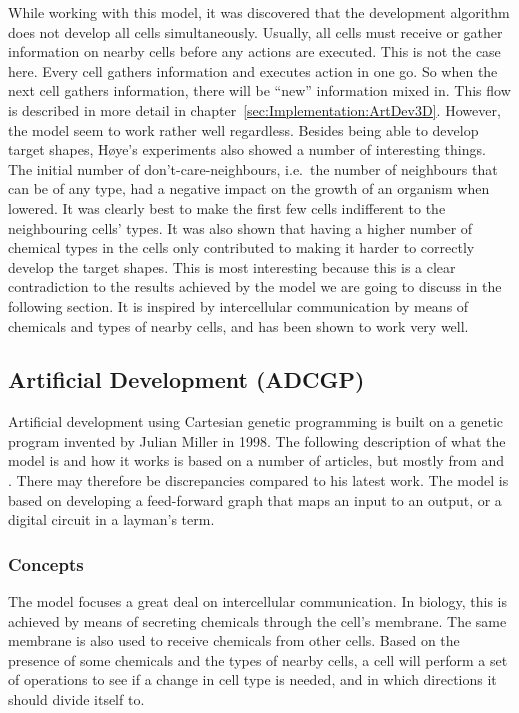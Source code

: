 While working with this model, it was discovered that the development algorithm does not develop all cells simultaneously. Usually, all cells must receive or gather information on nearby cells before any actions are executed. This is not the case here. Every cell gathers information and executes action in one go. So when the next cell gathers information, there will be ``new'' information mixed in. This flow is described in more detail in chapter~\ref{sec:Implementation:ArtDev3D}. However, the model seem to work rather well regardless. Besides being able to develop target shapes, H{\o}ye's experiments also showed a number of interesting things. The initial number of don't-care-neighbours, i.e.\ the number of neighbours that can be of any type, had a negative impact on the growth of an organism when lowered. It was clearly best to make the first few cells indifferent to the neighbouring cells' types. It was also shown that having a higher number of chemical types in the cells only contributed to making it harder to correctly develop the target shapes. This is most interesting because this is a clear contradiction to the results achieved by the model we are going to discuss in the following section. It is inspired by intercellular communication by means of chemicals and types of nearby cells, and has been shown to work very well.


\subsection{Artificial Development (ADCGP)}
Artificial development using Cartesian genetic programming is built on a genetic program invented by Julian Miller in 1998. The following description of what the model is and how it works is based on a number of articles, but mostly from \cite{mteurogp2000} and \cite{ecal2003}. There may therefore be discrepancies compared to his latest work. The model is based on developing a feed-forward graph that maps an input to an output, or a digital circuit in a layman's term.

\subsubsection{Concepts}
The model focuses a great deal on intercellular communication. In biology, this is achieved by means of secreting chemicals through the cell's membrane. The same membrane is also used to receive chemicals from other cells. Based on the presence of some chemicals and the types of nearby cells, a cell will perform a set of operations to see if a change in cell type is needed, and in which directions it should divide itself to.

